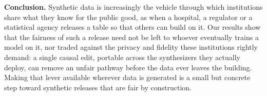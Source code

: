 {\textbf{Conclusion.} Synthetic data is increasingly the vehicle through which
institutions share what they know for the public good, as when a hospital, a
regulator or a statistical agency releases a table so that others can build on
it. Our results show that the fairness of such a release need not be left to
whoever eventually trains a model on it, nor traded against the privacy and
fidelity these institutions rightly demand: a single causal edit, portable
across the synthesizers they actually deploy, can remove an unfair pathway
before the data ever leaves the building. Making that lever available wherever
data is generated is a small but concrete step toward synthetic releases that
are fair by construction.%
}
